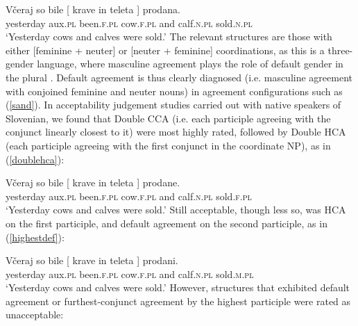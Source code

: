 \documentclass[output=paper
,modfonts
,nonflat]{langsci/langscibook}
\begin{document}
\ea \label{sand}
\gll Včeraj      so    bile       [ krave    in    teleta ]    prodana.\\
yesterday aux.\textsc{pl} been.\textsc{f.pl} {} cow.\textsc{f.pl} and calf.\textsc{n.pl} {}   sold.\textsc{n.pl} \\
\glt `Yesterday cows and calves were sold.' \citep{marusicnevinsbadecker:15}
\z
The relevant structures are those with either [feminine + neuter] or [neuter + feminine] coordinations, as this is a three-gender language, where masculine agreement plays the role of default gender in the plural \citep{marusicnevinsbadecker:15,willergold:16}. Default agreement is thus clearly diagnosed (i.e. masculine agreement with conjoined feminine and neuter nouns) in agreement configurations such as (\ref{sand}). In acceptability judgement studies carried out with native speakers of Slovenian, we found that Double CCA (i.e. each participle agreeing with the conjunct linearly closest to it) were most highly rated, followed by Double HCA (each participle agreeing with the first conjunct in the coordinate NP), as in (\ref{doublehca}):

\ea \label{doublehca}
\gll Včeraj so bile  [ krave in teleta ] prodane.\\
yesterday aux.\textsc{pl} been.\textsc{f.pl} {} cow.\textsc{f.pl} and calf.\textsc{n.pl} {} sold.\textsc{f.pl} \\
\glt `Yesterday cows and calves were sold.' 
\z
Still acceptable, though less so, was HCA on the first participle, and default agreement on the second participle, as in (\ref{highestdef}):

\ea \label{highestdef}
\gll Včeraj      so    bile       [ krave    in    teleta ]    prodani.\\
yesterday aux.\textsc{pl} been.\textsc{f.pl} {} cow.\textsc{f.pl} and calf.\textsc{n.pl} {}   sold.\textsc{m.pl} \\
\glt `Yesterday cows and calves were sold.' 
\z
However, structures that exhibited default agreement or furthest-conjunct agreement by the highest participle were rated as unacceptable:
\end{document}

